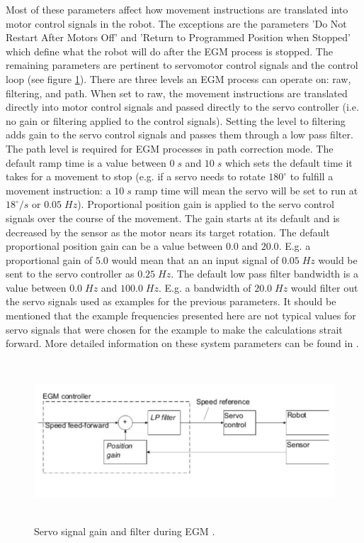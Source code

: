 \documentclass{cslthse-msc}
\begin{document}
Most of these parameters affect how movement instructions are translated into motor control signals in the robot. The exceptions are the parameters 'Do Not Restart After Motors Off' and 'Return to Programmed Position when Stopped' which define what the robot will do after the EGM process is stopped. The remaining parameters are pertinent to servomotor control signals and the control loop (see figure \ref{fig:lp_filter}). There are three levels an EGM process can operate on: raw, filtering, and path. When set to raw, the movement instructions are translated directly into motor control signals and passed directly to the servo controller (i.e. no gain or filtering applied to the control signals). Setting the level to filtering adds gain to the servo control signals and passes them through a low pass filter. The path level is required for EGM processes in path correction mode. The default ramp time is a value between $0 \; s$ and $10 \; s$ which sets the default time it takes for a movement to stop (e.g. if a servo needs to rotate $180^{\circ}$ to fulfill a movement instruction: a $10 \; s$ ramp time will mean the servo will be set to run at $18^{\circ}/s$ or $0.05 \; Hz$). Proportional position gain is applied to the servo control signals over the course of the movement. The gain starts at its default and is decreased by the sensor as the motor nears its target rotation. The default proportional position gain can be a value between $0.0$ and $20.0$. E.g. a proportional gain of $5.0$ would mean that an an input signal of $0.05 \; Hz$ would be sent to the servo controller as $0.25 \; Hz$. The default low pass filter bandwidth is a value between $0.0 \; Hz$ and $100.0 \; Hz$. E.g. a bandwidth of $20.0 \; Hz$ would filter out the servo signals used as examples for the previous parameters. It should be mentioned that the example frequencies presented here are not typical values for servo signals that were chosen for the example to make the calculations strait forward. More detailed information on these system parameters can be found in \cite[Sec. 6.12]{ABB:system_parameters}. \par

\begin{figure}[H]
\vspace{0.5cm}
    \centering
    \includegraphics[width=12cm, height=6cm]{LP_filter_fig.png}
    \caption{Servo signal gain and filter during EGM \cite[Sec. 9.3.2.5]{ABB:controller_software}.}
    \label{fig:lp_filter}
\end{figure}
\end{document}
